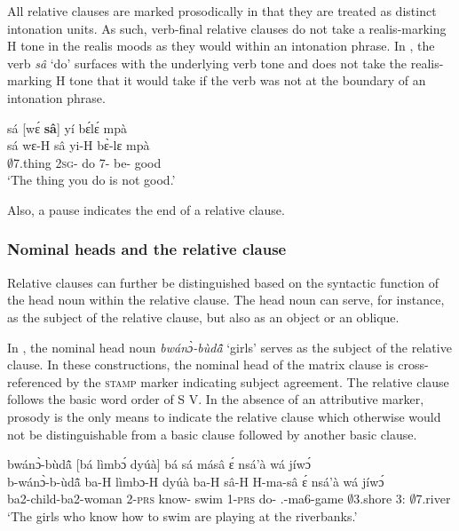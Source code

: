 All relative clauses are marked prosodically in that they are treated as distinct intonation units. As such, verb-final relative clauses do not take a realis-marking H tone in the realis moods as they would within an intonation phrase. In , the verb {\itshape sâ}  `do' surfaces with the underlying verb tone and does not take the realis-marking H tone that it would take if the verb was not at the boundary of an intonation phrase. 

\ea\label{SREL1x}
  \glll sá [wɛ́ {\bfseries sâ}]\textsubscript{{\REL}} yí bɛ́lɛ́ mpà\\
  sá {\db}wɛ-H sâ yi-H bɛ̀-lɛ mpà\\
  $\emptyset$7.thing {\db}2\textsc{sg}-{\PRS} do 7-{\PRS} be-{\NEG} good\\ 
  \trans `The thing you do is not good.'
\z

Also, a pause indicates the end of a relative clause.




\subsubsection{Nominal heads and the relative clause}
\label{sec:RELsyn}

Relative clauses can further be distinguished based on the syntactic function of the head noun within the relative clause. The head noun can serve, for instance, as the subject of the relative clause, but also as an object or an oblique.

In , the nominal head noun {\itshape bwánɔ̀-bùdã̂̂} `girls' serves as the subject of the relative clause. In these constructions, the nominal head of the matrix clause is cross-referenced by the \textsc{stamp} marker indicating subject agreement. The relative clause follows the basic word order of S V. In the absence of an attributive marker, prosody is the only means to indicate the relative clause which otherwise would not be distinguishable from a basic clause followed by another basic clause.


\ea\label{SREL1}
  \glll  bwánɔ̀-bùdã̂ [bá lìmbɔ́ dyúà]\textsubscript{{\REL}} bá sá másâ ɛ́ nsá'à wá jíwɔ́ \\
         b-wánɔ̀-b-ùdã̂ {\db}ba-H lìmbɔ-H dyúà ba-H sâ-H H-ma-sâ ɛ́ nsá'à wá jíwɔ́ \\
         ba2-child-ba2-woman {\db}2-\textsc{prs} know-{\R} swim 1-\textsc{prs} do-{\R} {\OBJ}.{\LINK}-ma6-game {\LOC} $\emptyset$3.shore 3:{\ATT} $\emptyset$7.river  \\
    \trans `The girls who know how to swim are playing at the riverbanks.'
\z

